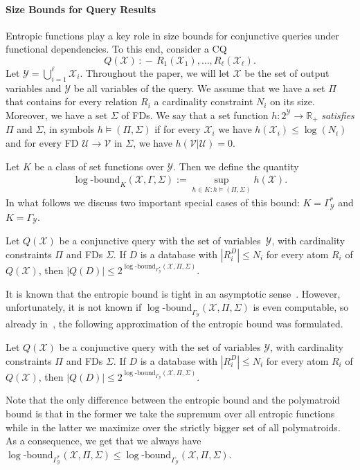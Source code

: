 \documentclass[a4paper,cleveref]{lipics-v2021}
\newcommand{\logb}{\mathrm{\log\text{-}bound}}
\newcommand{\vset}[1]{\mathcal{#1}}
\newcommand{\datarule}{{\,:\!\!-\,}}
\begin{document}
\paragraph*{Size Bounds for Query Results}

Entropic functions play a key role in size bounds for conjunctive queries under functional dependencies. To this end, consider a CQ 
\[ Q(\vset X) \datarule R_1(\vset X_1), \ldots,R_\ell(\vset X_\ell). \] Let $\vset Y = \bigcup\limits_{i=1}^\ell \vset X_i$.
Throughout the paper, we will let $\vset X$ be the set of output variables and $\vset Y$ be all variables of the query.
 We assume that we have a set $\Pi$ that contains for every relation $R_i$ a cardinality constraint $N_i$ on its size. Moreover, we have a set $\Sigma$ of FDs. We say that a set function $h:2^{\vset Y}\rightarrow \mathbb R_+$ \emph{satisfies} $\Pi$ and $\Sigma$, in symbols $h\models (\Pi, \Sigma)$ if for every $\vset X_i$ we have $h(\vset X_i) \le \log(N_i)$ and for every FD $\vset U \rightarrow \vset V$ in $\Sigma$, we have $h(\vset V|\vset U) = 0$.

Let $K$ be a class of set functions over $\vset Y$. Then we define the quantity 
\begin{align*}
	\logb_K(\vset X, \Gamma,\Sigma) := \sup_{h\in K: h\models (\Pi, \Sigma)} h(\vset X).
\end{align*}
%
In what follows we discuss two important special cases of this bound: $K = \Gamma^*_{\mathcal Y}$ and $K=\Gamma_{\mathcal Y}$.

\begin{theorem}
\label{th:5}
	Let $Q(\vset X)$ be a conjunctive query with the set of variables~$\vset Y$, with cardinality constraints $\Pi$ and FDs $\Sigma$.
	If $D$ is a database with $|R_i^D| \le N_i$ for every atom $R_i$ of $Q(\vset X)$, then
	\(
		|Q(D)| \le 2^{\logb_{\Gamma^*_{\vset Y}}(\vset X, \Pi, \Sigma)}.
	\)
\end{theorem}

It is known that the entropic bound is tight in an asymptotic sense~\cite{GogaczT17}. However, unfortunately, it is not known if $\logb_{\Gamma_{\vset Y}}(\vset X, \Pi, \Sigma)$ is even computable, so already in~\cite{GottlobLVV12}, the following approximation of the entropic bound was formulated.

\begin{theorem}
\label{th:6}
	Let $Q(\vset X)$ be a conjunctive query  with the set of variables $\vset Y$, with cardinality constraints $\Pi$ and FDs $\Sigma$.
	 If $D$ is a database with $|R_i^D| \le N_i$ for every atom $R_i$ of $Q(\vset X)$, then
	\(
		|Q(D)| \le 2^{\logb_{\Gamma_{\vset Y}}(\vset X, \Pi, \Sigma)}.
	\)
\end{theorem}
Note that the only difference between the entropic bound and the polymatroid bound is that in the former we take the supremum over all entropic functions while in the latter we maximize over the strictly bigger set of all polymatroids. As a consequence, we get that we always have $\logb_{\Gamma^*_{\vset Y}}(\vset X, \Pi, \Sigma) \le \logb_{\Gamma_{\vset Y}}(\vset X, \Pi, \Sigma)$.
\end{document}
